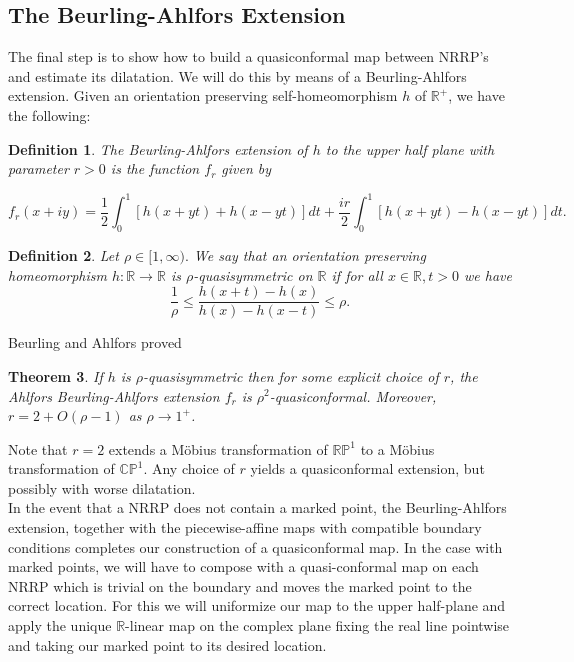\documentclass[12pt]{article}
\newtheorem{theorem}{Theorem}[section]
\newtheorem{definition}[theorem]{Definition}
\newcommand{\rr}{\mathbb{R}}
\begin{document}
\subsection{The Beurling-Ahlfors Extension}

\noindent The final step is to show how to build a quasiconformal map between NRRP's and estimate its dilatation. We will do this by means of a Beurling-Ahlfors extension. Given an orientation preserving self-homeomorphism $h$ of $\rr^+$, we have the following:

\begin{definition}The \emph{Beurling-Ahlfors extension} of $h$ to the upper half plane \emph{with parameter} $r > 0$ is the function $f_r$ given by\end{definition}

$$f_r(x + iy) = \frac{1}{2}\int_0^1 [h(x + yt) + h(x - yt)]dt + \frac{ir}{2}\int_0^1 [h(x + yt) - h(x - yt)]dt.$$

\begin{definition}Let $\rho \in [1,\infty).$ We say that an orientation preserving homeomorphism $h: \rr \to \rr$ is $\rho$-\emph{quasisymmetric} on $\rr$ if for all $x\in \rr, t > 0$ we have $$\frac{1}{\rho} \leq \frac{h(x + t) - h(x)}{h(x) - h(x - t)} \leq \rho.$$\end{definition}

\noindent Beurling and Ahlfors \cite{BA} proved

\begin{theorem}If $h$ is $\rho$-quasisymmetric then for some explicit choice of $r$, the Ahlfors Beurling-Ahlfors extension $f_r$ is $\rho^2$-quasiconformal. Moreover, $r = 2 + O(\rho - 1)$ as $\rho \to 1^+$.\end{theorem}

\noindent Note that $r = 2$ extends a M\"obius transformation of $\mathbb{RP}^1$ to a M\"obius transformation of $\mathbb{CP}^1$. Any choice of $r$ yields a quasiconformal extension, but possibly with worse dilatation.\\

\noindent In the event that a NRRP does not contain a marked point, the Beurling-Ahlfors extension, together with the piecewise-affine maps with compatible boundary conditions completes our construction of a quasiconformal map. In the case with marked points, we will have to compose with a quasi-conformal map on each NRRP which is trivial on the boundary and moves the marked point to the correct location. For this we will uniformize our map to the upper half-plane and apply the unique $\rr$-linear map on the complex plane fixing the real line pointwise and taking our marked point to its desired location.\\
\end{document}
